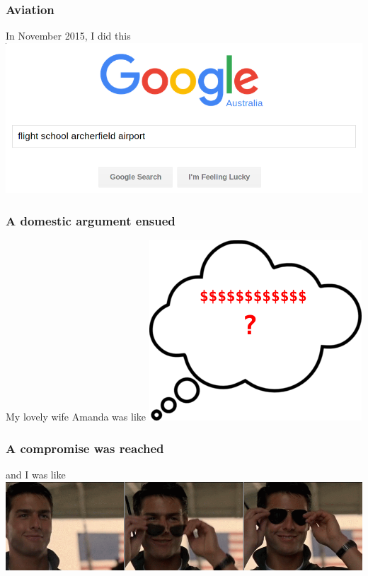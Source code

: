\begin{frame}
\frametitle{Aviation}
\begin{block}{In November 2015, I did this}
\includegraphics[height=0.5\textheight]{image/flight-school-google.png}
\end{block}
\end{frame}

\begin{frame}
\frametitle{A domestic argument ensued}
\begin{block}{My lovely wife Amanda was like}
\includegraphics[height=0.5\textheight]{image/thought-bubble-dollars.png}
\end{block}
\end{frame}

\begin{frame}
\frametitle{A compromise was reached}
\begin{block}{and I was like}
\includegraphics[height=0.3\textheight]{image/tom-cruise.png}
\end{block}
\end{frame}

